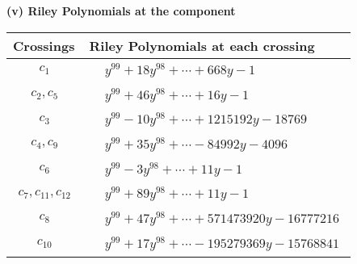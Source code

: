 \documentclass[1p]{elsarticle_modified}
\theoremstyle{definition}
\begin{document}
\newpage\renewcommand{\arraystretch}{1}
\flushleft \textbf{(v) Riley Polynomials at the component}\newline \\
\begin{tabular}{m{50pt}|m{274pt}}
Crossings & \hspace{64pt}Riley Polynomials at each crossing \\
\hline $$\begin{aligned}c_{1}\end{aligned}$$&$\begin{aligned}
&y^{99}+18 y^{98}+\cdots+668 y-1
\end{aligned}$\\
\hline $$\begin{aligned}c_{2},c_{5}\end{aligned}$$&$\begin{aligned}
&y^{99}+46 y^{98}+\cdots+16 y-1
\end{aligned}$\\
\hline $$\begin{aligned}c_{3}\end{aligned}$$&$\begin{aligned}
&y^{99}-10 y^{98}+\cdots+1215192 y-18769
\end{aligned}$\\
\hline $$\begin{aligned}c_{4},c_{9}\end{aligned}$$&$\begin{aligned}
&y^{99}+35 y^{98}+\cdots-84992 y-4096
\end{aligned}$\\
\hline $$\begin{aligned}c_{6}\end{aligned}$$&$\begin{aligned}
&y^{99}-3 y^{98}+\cdots+11 y-1
\end{aligned}$\\
\hline $$\begin{aligned}c_{7},c_{11},c_{12}\end{aligned}$$&$\begin{aligned}
&y^{99}+89 y^{98}+\cdots+11 y-1
\end{aligned}$\\
\hline $$\begin{aligned}c_{8}\end{aligned}$$&$\begin{aligned}
&y^{99}+47 y^{98}+\cdots+571473920 y-16777216
\end{aligned}$\\
\hline $$\begin{aligned}c_{10}\end{aligned}$$&$\begin{aligned}
&y^{99}+17 y^{98}+\cdots-195279369 y-15768841
\end{aligned}$\\
\hline
\end{tabular}\\~\\
\end{document}
